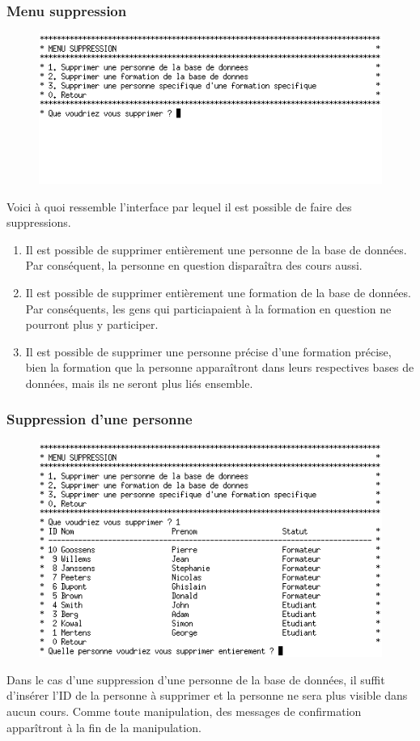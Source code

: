 \documentclass[11pt]{article}
\begin{document}
\newpage
\subsubsection{Menu suppression}
\begin{figure}[ht]
  \centering
  \includegraphics[trim=0 80 0 0, clip, scale=0.8]{images/16.png.png}
\end{figure}

Voici à quoi ressemble l'interface par lequel il est possible de faire des suppressions.
\begin{enumerate}
\item Il est possible de supprimer entièrement une personne de la base de données. Par conséquent, la personne en question disparaîtra des cours aussi.
\item Il est possible de supprimer entièrement une formation de la base de données. Par conséquents, les gens qui particiapaient à la formation en question ne pourront plus y participer.
\item Il est possible de supprimer une personne précise d'une formation précise, bien la formation que la personne apparaîtront dans leurs respectives bases de données, mais ils ne seront plus liés ensemble.
\end{enumerate}

\subsubsection{Suppression d'une personne}
\begin{figure}[ht]
  \centering
  \includegraphics[trim=0 0 0 0, clip, scale=0.8]{images/17.png.png}
\end{figure}
Dans le cas d'une suppression d'une personne de la base de données, il suffit d'insérer l'ID de la personne à supprimer et la personne ne sera plus visible dans aucun cours. Comme toute manipulation, des messages de confirmation apparîtront à la fin de la manipulation.
\end{document}
